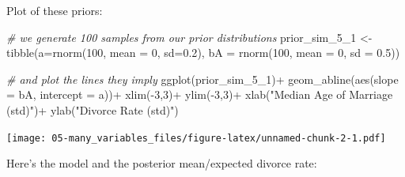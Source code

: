 \documentclass[
]{book}
\newenvironment{Shaded}{\begin{snugshade}}{\end{snugshade}}
\newcommand{\AttributeTok}[1]{\textcolor[rgb]{0.77,0.63,0.00}{#1}}
\newcommand{\CommentTok}[1]{\textcolor[rgb]{0.56,0.35,0.01}{\textit{#1}}}
\newcommand{\DecValTok}[1]{\textcolor[rgb]{0.00,0.00,0.81}{#1}}
\newcommand{\FloatTok}[1]{\textcolor[rgb]{0.00,0.00,0.81}{#1}}
\newcommand{\FunctionTok}[1]{\textcolor[rgb]{0.00,0.00,0.00}{#1}}
\newcommand{\NormalTok}[1]{#1}
\newcommand{\OtherTok}[1]{\textcolor[rgb]{0.56,0.35,0.01}{#1}}
\newcommand{\SpecialCharTok}[1]{\textcolor[rgb]{0.00,0.00,0.00}{#1}}
\newcommand{\StringTok}[1]{\textcolor[rgb]{0.31,0.60,0.02}{#1}}
\begin{document}
Plot of these priors:

\begin{Shaded}
\begin{Highlighting}[]
\CommentTok{\# we generate 100 samples from our prior distributions}
\NormalTok{prior\_sim\_5\_1 }\OtherTok{\textless{}{-}} \FunctionTok{tibble}\NormalTok{(}\AttributeTok{a=}\FunctionTok{rnorm}\NormalTok{(}\DecValTok{100}\NormalTok{, }\AttributeTok{mean =} \DecValTok{0}\NormalTok{, }\AttributeTok{sd=}\FloatTok{0.2}\NormalTok{),}
                    \AttributeTok{bA =} \FunctionTok{rnorm}\NormalTok{(}\DecValTok{100}\NormalTok{, }\AttributeTok{mean =} \DecValTok{0}\NormalTok{, }\AttributeTok{sd =} \FloatTok{0.5}\NormalTok{))}

\CommentTok{\# and plot the lines they imply}
\FunctionTok{ggplot}\NormalTok{(prior\_sim\_5\_1)}\SpecialCharTok{+}
  \FunctionTok{geom\_abline}\NormalTok{(}\FunctionTok{aes}\NormalTok{(}\AttributeTok{slope =}\NormalTok{ bA,}
                  \AttributeTok{intercept =}\NormalTok{ a))}\SpecialCharTok{+}
  \FunctionTok{xlim}\NormalTok{(}\SpecialCharTok{{-}}\DecValTok{3}\NormalTok{,}\DecValTok{3}\NormalTok{)}\SpecialCharTok{+}
  \FunctionTok{ylim}\NormalTok{(}\SpecialCharTok{{-}}\DecValTok{3}\NormalTok{,}\DecValTok{3}\NormalTok{)}\SpecialCharTok{+}
  \FunctionTok{xlab}\NormalTok{(}\StringTok{"Median Age of Marriage (std)"}\NormalTok{)}\SpecialCharTok{+}
  \FunctionTok{ylab}\NormalTok{(}\StringTok{"Divorce Rate (std)"}\NormalTok{)}
\end{Highlighting}
\end{Shaded}

\texttt{[image: 05-many\_variables\_files/figure-latex/unnamed-chunk-2-1.pdf]}

Here's the model and the posterior mean/expected divorce rate:
\end{document}
